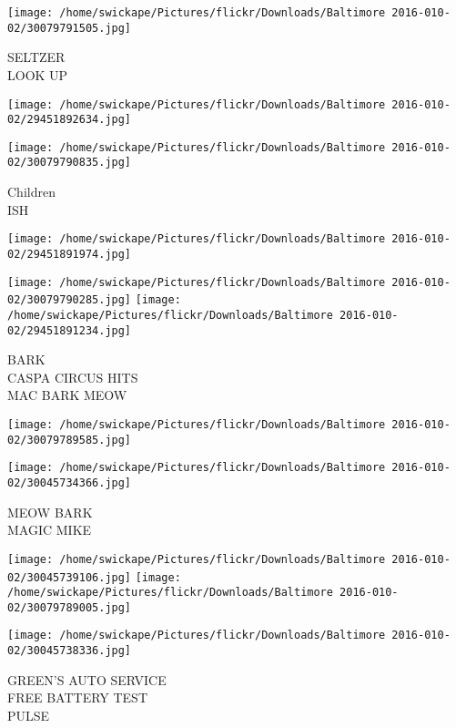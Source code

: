 \documentclass[10pt,letterpaper]{article}
\begin{document}
\vspace{0.25in}
\texttt{[image: /home/swickape/Pictures/flickr/Downloads/Baltimore 2016-010-02/30079791505.jpg]}

SELTZER\\
LOOK UP\\
\pagebreak

\texttt{[image: /home/swickape/Pictures/flickr/Downloads/Baltimore 2016-010-02/29451892634.jpg]}

\vspace{0.25in}
\texttt{[image: /home/swickape/Pictures/flickr/Downloads/Baltimore 2016-010-02/30079790835.jpg]}

Children\\
ISH\\
\pagebreak

\texttt{[image: /home/swickape/Pictures/flickr/Downloads/Baltimore 2016-010-02/29451891974.jpg]}

\vspace{0.25in}
\texttt{[image: /home/swickape/Pictures/flickr/Downloads/Baltimore 2016-010-02/30079790285.jpg]}
\texttt{[image: /home/swickape/Pictures/flickr/Downloads/Baltimore 2016-010-02/29451891234.jpg]}

BARK\\
CASPA CIRCUS HITS\\
MAC BARK MEOW\\
\pagebreak

\texttt{[image: /home/swickape/Pictures/flickr/Downloads/Baltimore 2016-010-02/30079789585.jpg]}

\vspace{0.25in}
\texttt{[image: /home/swickape/Pictures/flickr/Downloads/Baltimore 2016-010-02/30045734366.jpg]}

MEOW BARK\\
MAGIC MIKE\\
\pagebreak

\texttt{[image: /home/swickape/Pictures/flickr/Downloads/Baltimore 2016-010-02/30045739106.jpg]}
\texttt{[image: /home/swickape/Pictures/flickr/Downloads/Baltimore 2016-010-02/30079789005.jpg]}

\texttt{[image: /home/swickape/Pictures/flickr/Downloads/Baltimore 2016-010-02/30045738336.jpg]}

GREEN'S AUTO SERVICE\\
FREE BATTERY TEST\\
PULSE\\
\pagebreak
\end{document}
